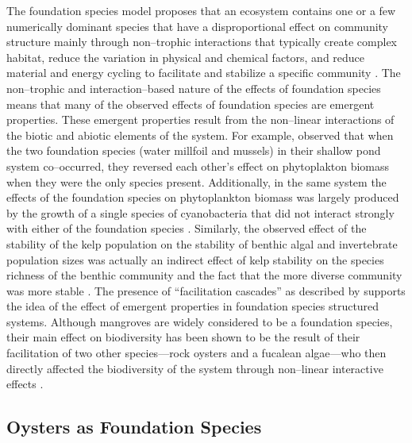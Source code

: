 \documentclass{article}
\begin{document}
The foundation species model proposes that an ecosystem contains one or a few numerically dominant species that have a disproportional effect on community structure mainly through non--trophic interactions that typically create complex habitat,  reduce the variation in physical and chemical factors, and reduce material and energy cycling to facilitate and stabilize a specific community \cite{ellison_loss_2005, angelini_interactions_2011, ellison_foundation_2019, fields_foundation_2022}. The non--trophic and interaction--based nature of the effects of foundation species means that many of the observed effects of foundation species are emergent properties. These emergent properties result from the non--linear interactions of the biotic and abiotic elements of the system. For example,  observed that when the two foundation species (water millfoil and mussels) in their shallow pond system co--occurred, they reversed each other's effect on phytoplakton biomass when they were the only species present. Additionally, in the same system the effects of the foundation species on phytoplankton biomass was largely produced by the growth of a single species of cyanobacteria that did not interact strongly with either of the foundation species \cite{narwani_interactive_2019}. Similarly, the observed effect of the stability of the kelp population on the stability of benthic algal and invertebrate population sizes was actually an indirect effect of kelp stability on the species richness of the benthic community and the fact that the more diverse community was more stable \cite{lamy_foundation_2020}. The presence of ``facilitation cascades'' as described by  supports the idea of the effect of emergent properties in foundation species structured systems. Although mangroves are widely considered to be a foundation species, their main effect on biodiversity has been shown to be the result of their facilitation of two other species---rock oysters and a fucalean algae---who then directly affected the biodiversity of the system through non--linear interactive effects \cite{vozzo_co-occuring_2019}.


\subsection*{Oysters as Foundation Species}
\end{document}
